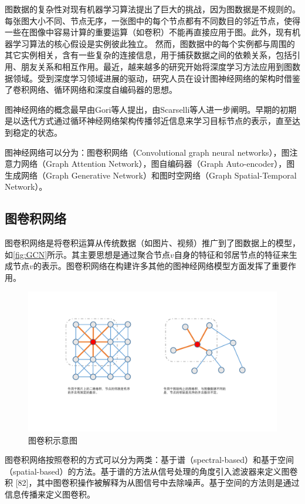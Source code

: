 图数据的复杂性对现有机器学习算法提出了巨大的挑战，因为图数据是不规则的。每张图大小不同、节点无序，一张图中的每个节点都有不同数目的邻近节点，使得一些在图像中容易计算的重要运算（如卷积）不能再直接应用于图。此外，现有机器学习算法的核心假设是实例彼此独立。
然而，图数据中的每个实例都与周围的其它实例相关，含有一些复杂的连接信息，用于捕获数据之间的依赖关系，包括引用、朋友关系和相互作用。最近，越来越多的研究开始将深度学习方法应用到图数据领域。受到深度学习领域进展的驱动，研究人员在设计图神经网络的架构时借鉴了卷积网络、循环网络和深度自编码器的思想。

图神经网络的概念最早由Gori\cite{gori2005new}等人提出，由Scarselli\cite{scarselli2008graph}等人进一步阐明。早期的初期是以迭代方式通过循环神经网络架构传播邻近信息来学习目标节点的表示，直至达到稳定的状态。

图神经网络可以分为：图卷积网络（Convolutional graph neural networks），图注意力网络（Graph Attention Network），图自编码器（Graph Auto-encoder），图生成网络（Graph Generative Network）和图时空网络（Graph Spatial-Temporal Network）。

\subsection{图卷积网络}
图卷积网络是将卷积运算从传统数据（如图片、视频）推广到了图数据上的模型，如\autoref{fig:GCN}所示。其主要思想是通过聚合节点$v$自身的特征和邻居节点的特征来生成节点$v$的表示。图卷积网络在构建许多其他的图神经网络模型方面发挥了重要作用。
\begin{figure}[htb]
    \includegraphics[width=1.2\textwidth]{fig/GCN.pdf}
    \caption{图卷积示意图}
    \label{fig:GCN}
  \end{figure}
图卷积网络按照卷积的方式可以分为两类：基于谱（spectral-based）和基于空间（spatial-based）的方法。基于谱的方法从信号处理的角度引入滤波器来定义图卷积 [82]，其中图卷积操作被解释为从图信号中去除噪声。基于空间的方法则是通过信息传播来定义图卷积。

